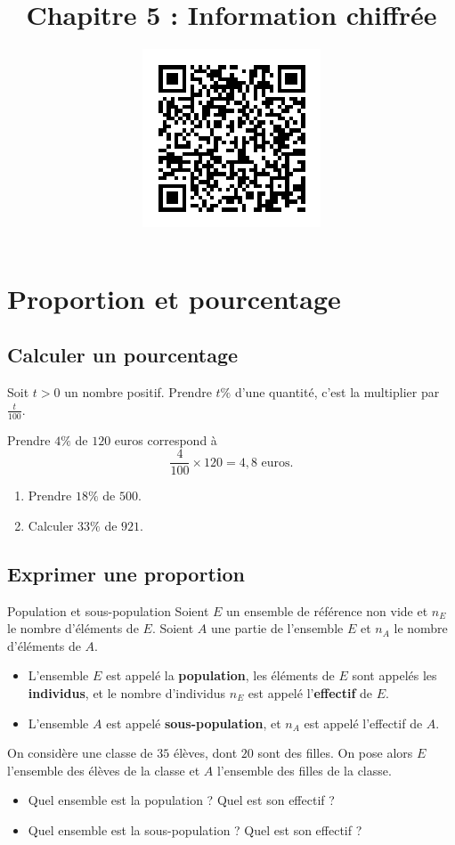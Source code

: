 \documentclass[11pt]{article}
\title{Chapitre 5 : Information chiffrée}
\date{}
\date{\vspace{-14mm}
\href{https://erou.forge.aeif.fr/s11/information.html}{
  \includegraphics[scale=.6]{qrcode-information.png}}
\vspace{-12mm}}
\author{}
\begin{document}
\vspace{-2cm}
\maketitle\thispagestyle{fancy}

\section{Proportion et pourcentage}
\subsection{Calculer un pourcentage}
\begin{prop}
  Soit $t>0$ un nombre positif. Prendre $t\%$ d'une quantité, c'est la
  multiplier par
  \(
    \frac{t}{100}.
  \)
\end{prop}
\begin{exemple}
  Prendre $4\%$ de $120$ euros correspond à
  \[
    \frac{4}{100}\times 120 = 4,8\text{ euros.}
  \]
\end{exemple}
\begin{app}
  \begin{enumerate}
    \item Prendre $18\%$ de $500$.
    \item Calculer $33\%$ de $921$.
  \end{enumerate}
\end{app}

\subsection{Exprimer une proportion}
\begin{defi}{Population et sous-population}
  Soient $E$ un ensemble de référence non vide et $n_E$ le nombre d'éléments de
  $E$. Soient $A$ une partie de l'ensemble $E$ et $n_A$ le nombre d'éléments de
  $A$.
  \begin{itemize}
    \item L'ensemble $E$ est appelé la \textbf{population}, les éléments de $E$
      sont appelés les \textbf{individus}, et le nombre d'individus $n_E$ est
      appelé l'\textbf{effectif} de $E$.
    \item L'ensemble $A$ est appelé \textbf{sous-population}, et $n_A$ est
      appelé l'effectif de $A$.
  \end{itemize}
\end{defi}
\begin{app}
  On considère une classe de $35$ élèves, dont $20$ sont des filles. On pose
  alors $E$ l'ensemble des élèves de la classe et $A$ l'ensemble des filles de
  la classe.
  \begin{itemize}
    \item Quel ensemble est la population ? Quel est son effectif ?
    \item Quel ensemble est la sous-population ? Quel est son effectif ?
  \end{itemize}
\end{app}
\end{document}
